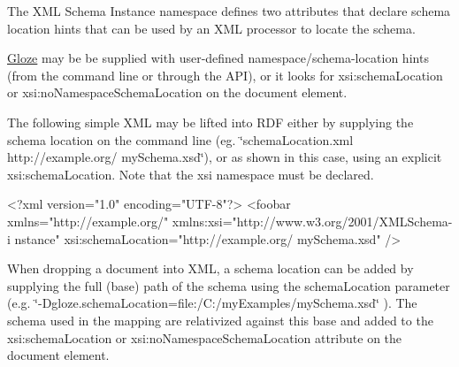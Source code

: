 The XML Schema Instance namespace defines two attributes that declare schema location hints that can be used by an XML processor to locate the schema.

\hyperlink{classcom_1_1hp_1_1gloze_1_1_gloze}{Gloze} may be be supplied with user-\/defined namespace/schema-\/location hints (from the command line or through the API), or it looks for xsi:schemaLocation or xsi:noNamespaceSchemaLocation on the document element.

The following simple XML may be lifted into RDF either by supplying the schema location on the command line (eg. \char`\"{}schemaLocation.xml http://example.org/ mySchema.xsd\char`\"{}), or as shown in this case, using an explicit xsi:schemaLocation. Note that the xsi namespace must be declared.


\begin{DoxyCodeInclude}
<?xml version="1.0" encoding="UTF-8"?>
<foobar xmlns="http://example.org/" xmlns:xsi="http://www.w3.org/2001/XMLSchema-i
      nstance" 
xsi:schemaLocation="http://example.org/ mySchema.xsd" />
\end{DoxyCodeInclude}


When dropping a document into XML, a schema location can be added by supplying the full (base) path of the schema using the schemaLocation parameter (e.g. \char`\"{}-\/Dgloze.schemaLocation=file:/C:/myExamples/mySchema.xsd\char`\"{} ). The schema used in the mapping are relativized against this base and added to the xsi:schemaLocation or xsi:noNamespaceSchemaLocation attribute on the document element. 